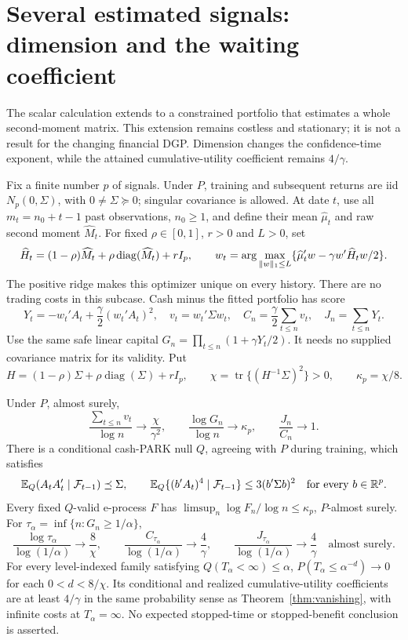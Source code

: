 \section{Several estimated signals: dimension and the waiting coefficient}
\label{sec:multivariate-waiting}
The scalar calculation extends to a constrained portfolio that estimates a
whole second-moment matrix. This extension remains costless and stationary;
it is not a result for the changing financial DGP. Dimension changes the
confidence-time exponent, while the attained cumulative-utility coefficient
remains $4/\gamma$.

Fix a finite number $p$ of signals. Under $P$, training and subsequent returns
are iid $N_p(0,\Sigma)$, with $0\ne\Sigma\succeq0$; singular covariance is
allowed. At date $t$, use all $m_t=n_0+t-1$ past observations, $n_0\ge1$, and
define their mean $\widehat\mu_t$ and raw second moment $\widehat M_t$.
For fixed $\rho\in[0,1]$, $r>0$ and $L>0$, set
\[
 \widehat H_t=(1-\rho)\widehat M_t+
                 \rho\operatorname{diag}(\widehat M_t)+rI_p,
 \qquad
 w_t=\arg\max_{\lVert w\rVert_1\le L}
        \{\widehat\mu_t'w-\gamma w'\widehat H_tw/2\}.
\]
The positive ridge makes this optimizer unique on every history. There are
no trading costs in this subcase. Cash minus the fitted portfolio has score
\[
 Y_t=-w_t'A_t+\frac\gamma2(w_t'A_t)^2,
 \quad v_t=w_t'\Sigma w_t,
 \quad C_n=\frac\gamma2\sum_{t\le n}v_t,
 \quad J_n=\sum_{t\le n}Y_t.
\]
Use the same safe linear capital $G_n=\prod_{t\le n}(1+\gamma Y_t/2)$.
It needs no supplied covariance matrix for its validity. Put
\[
 H=(1-\rho)\Sigma+\rho\operatorname{diag}(\Sigma)+rI_p,
 \qquad \chi=\operatorname{tr}\{(H^{-1}\Sigma)^2\}>0,
 \qquad \kappa_p=\chi/8.
\]

\begin{theorem}
\label{thm:multivariate-waiting}
Under $P$, almost surely,
\[
 \frac{\sum_{t\le n}v_t}{\log n}\to\frac\chi{\gamma^2},
 \qquad \frac{\log G_n}{\log n}\to\kappa_p,
 \qquad \frac{J_n}{C_n}\to1.
\]
There is a conditional cash-PARK null $Q$, agreeing with $P$ during training,
which satisfies
\[
 \mathbb E_Q(A_tA_t'\mid\mathcal F_{t-1})\preceq\Sigma,
 \qquad
 \mathbb E_Q\{(b'A_t)^4\mid\mathcal F_{t-1}\}\le3(b'\Sigma b)^2
 \quad\text{for every }b\in\mathbb R^p.
\]
Every fixed $Q$-valid e-process $F$ has
$\limsup_n\log F_n/\log n\le\kappa_p$, $P$-almost surely.
For $\tau_\alpha=\inf\{n:G_n\ge1/\alpha\}$,
\[
 \frac{\log\tau_\alpha}{\log(1/\alpha)}\to\frac8\chi,
 \qquad
 \frac{C_{\tau_\alpha}}{\log(1/\alpha)}\to\frac4\gamma,
 \qquad
 \frac{J_{\tau_\alpha}}{\log(1/\alpha)}\to\frac4\gamma
 \quad\text{almost surely}.
\]
For every level-indexed family satisfying $Q(T_\alpha<\infty)\le\alpha$,
$P(T_\alpha\le\alpha^{-d})\to0$ for each $0<d<8/\chi$. Its conditional and
realized cumulative-utility coefficients are at least $4/\gamma$ in the
same probability sense as Theorem~\ref{thm:vanishing}, with infinite costs at
$T_\alpha=\infty$. No expected stopped-time or stopped-benefit conclusion is
asserted.
\end{theorem}

